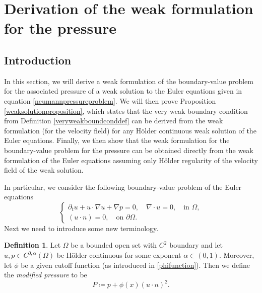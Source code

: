 \documentclass[12pt,a4paper]{article}
\theoremstyle{definition}
\newtheorem{definition}[theorem]{Definition}
\theoremstyle{remark}
\numberwithin{equation}{section}
\begin{document}
\section{Derivation of the weak formulation for the pressure} \label{weakformulationsection}
\subsection{Introduction}
In this section, we will derive a weak formulation of the boundary-value problem for the associated pressure of a weak solution to the Euler equations given in equation \eqref{neumannpressureproblem}. We will then prove Proposition \ref{weaksolutionproposition}, which states that the very weak boundary condition from Definition \ref{veryweakboundconddef} can be derived from the weak formulation (for the velocity field) for any Hölder continuous weak solution of the Euler equations. Finally, we then show that the weak formulation for the boundary-value problem for the pressure can be obtained directly from the weak formulation of the Euler equations assuming only Hölder regularity of the velocity field of the weak solution.

In particular, we consider the following boundary-value problem of the Euler equations
\begin{equation} \label{eulerboundaryvalueproblem}
\begin{cases}
\partial_t u + u \cdot \nabla u + \nabla p = 0, \quad \nabla \cdot u = 0, \quad \text{in } \Omega, \\
 (u \cdot n) = 0, \quad \text{on } \partial \Omega.
\end{cases}
\end{equation}
Next we need to introduce some new terminology.
\begin{definition} \label{modifiedpressuredef}
Let $\Omega$ be a bounded open set with $C^2$ boundary and let $u, p \in C^{0,\alpha} (\Omega)$ be Hölder continuous for some exponent $\alpha \in (0,1)$. Moreover, let $\phi$ be a given cutoff function (as introduced in \eqref{phifunction}). Then we define the \textit{modified pressure} to be
\begin{equation}
P \coloneqq p + \phi (x) (u \cdot n)^2.
\end{equation}
\end{definition}
\end{document}
